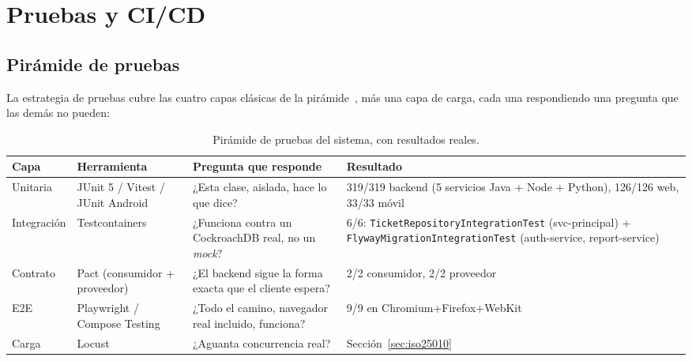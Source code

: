 \section{Pruebas y CI/CD}
\label{sec:pruebas-cicd}

\subsection{Pirámide de pruebas}

La estrategia de pruebas cubre las cuatro capas clásicas de la pirámide~\cite{ammann2016testing},
más una capa de carga, cada una respondiendo una pregunta que las demás no pueden:

\begin{table}[H]
\centering
\small
\caption{Pirámide de pruebas del sistema, con resultados reales.}
\label{tab:piramide}
\begin{tabular}{@{}p{2.3cm}p{3.4cm}p{4.2cm}p{3.2cm}@{}}
\toprule
\textbf{Capa} & \textbf{Herramienta} & \textbf{Pregunta que responde} & \textbf{Resultado} \\
\midrule
Unitaria & JUnit 5 / Vitest / JUnit Android & ¿Esta clase, aislada, hace lo que dice? & 319/319 backend (5 servicios Java + Node + Python), 126/126 web, 33/33 móvil \\
Integración & Testcontainers & ¿Funciona contra un CockroachDB real, no un \emph{mock}? & 6/6: \texttt{TicketRepositoryIntegrationTest} (svc-principal) + \texttt{FlywayMigrationIntegrationTest} (auth-service, report-service) \\
Contrato & Pact (consumidor + proveedor) & ¿El backend sigue la forma exacta que el cliente espera? & 2/2 consumidor, 2/2 proveedor \\
E2E & Playwright / Compose Testing & ¿Todo el camino, navegador real incluido, funciona? & 9/9 en Chromium+Firefox+WebKit \\
Carga & Locust & ¿Aguanta concurrencia real? & Sección~\ref{sec:iso25010} \\
\bottomrule
\end{tabular}
\end{table}

